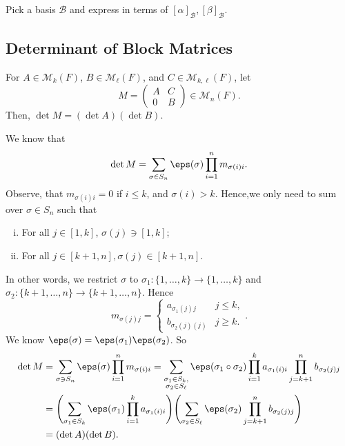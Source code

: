 \documentclass[12pt]{article}
\begin{document}
\begin{proofbox}
	Pick a basis $\mathcal{B}$ and express in terms of $[\alpha]_{\mathcal{B}}, [\beta]_{\mathcal{B}}$.
\end{proofbox}

\subsection{Determinant of Block Matrices}%
\label{sub:determinant_of_block_matrices}

\begin{lemma}
	For $A \in \mathcal{M}_{k}(F)$, $B \in \mathcal{M}_{\ell}(F)$, and $C \in \mathcal{M}_{k, \ell}(F)$, let
	\[
	M =
	\begin{pmatrix}
		A & C \\
		0 & B
	\end{pmatrix} \in \mathcal{M}_n(F)
	.\]
	Then, $\det M = (\det A)(\det B)$.
\end{lemma}

\begin{proofbox}
	We know that
	\[
		\det M = \sum_{\sigma \in S_n} \eps(\sigma) \prod_{i = 1}^{n} m_{\sigma(i)i}
	.\]
	Observe, that $m_{\sigma(i)i} = 0$ if $i \leq k$, and $\sigma(i) > k$. Hence,we only need to sum over $\sigma \in S_n$ such that
	\begin{enumerate}[(i)]
		\item For all $j \in [1, k]$, $\sigma(j) \ni [1, k]$;
		\item For all $j \in [k+1, n], \sigma(j) \in [k+1,n]$.
	\end{enumerate}
	In other words, we restrict $\sigma$ to $\sigma_1 : \{1, \ldots, k\} \to \{1, \ldots, k\}$ and  $\sigma_2 : \{k+1, \ldots, n\} \to \{k+1, \ldots, n\}$. Hence
	\[
		m_{\sigma(j)j} =
		\begin{cases}
			a_{\sigma_1(j)j} & j \leq k, \\
			b_{\sigma_2(j)(j)} & j \geq k.
		\end{cases}
	.\]
	We know $\eps(\sigma) = \eps(\sigma_1) \eps(\sigma_2)$. So
	\begin{align*}
		\det M &= \sum_{\sigma \ni S_n}\eps(\sigma) \prod_{i = 1}^{n} m_{\sigma(i)i} = \sum_{\substack{\sigma_1 \in S_k, \\ \sigma_2 \in S_{\ell}}}\eps(\sigma_1 \circ \sigma_2) \prod_{i = 1}^{k} a_{\sigma_1(i)i} \prod_{j = k+1}^{n} b_{\sigma_2(j)j} \\
		       &= \Biggl( \sum_{\sigma_1 \in S_k} \eps(\sigma_1) \prod_{i = 1}^{k} a_{\sigma_1(i)i} \Biggr) \Biggl( \sum_{\sigma_2 \in S_{\ell}} \eps(\sigma_2) \prod_{j = k+1}^{n} b_{\sigma_2(j)j} \Biggr) \\
		       &= (\det A)(\det B).
	\end{align*}
\end{proofbox}
\end{document}
